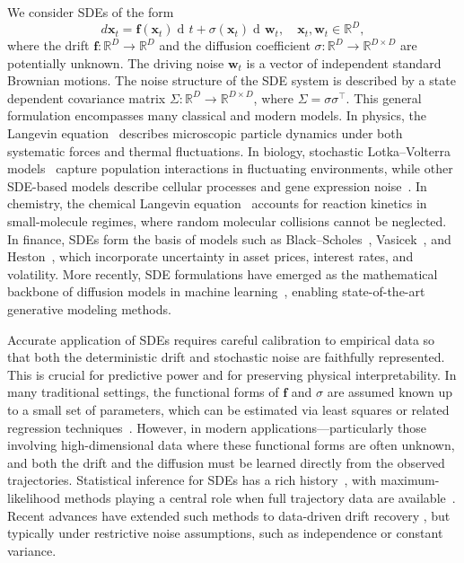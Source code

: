 \documentclass[11pt]{article} %
\def\rvw{{\mathbf{w}}}
\def\rvx{{\mathbf{x}}}
\def\vf{{\bm{f}}}
\newcommand{\R}{\mathbb{R}}
\DeclareMathOperator{\dif}{d \!}        %
\begin{document}
We consider SDEs of the form
\[
d\rvx_t = \vf(\rvx_t)\dif t + \sigma(\rvx_t) \dif \rvw_t, \quad \rvx_t, \rvw_t \in \R^D,
\]
where the drift $\vf: \R^D \rightarrow \R^D$ and the diffusion coefficient $\sigma: \R^D \rightarrow \R^{D \times D}$ are potentially unknown.  The driving noise $\rvw_t$ is a vector of independent standard Brownian motions. The noise structure of the SDE system is described by a state dependent covariance matrix $\Sigma: \R^D \rightarrow \R^{D \times D}$, where $\Sigma = \sigma \sigma^\intercal$.  This general formulation encompasses many classical and modern models. In physics, the Langevin equation~\citep{sachs2017langevin, doi:10.1142/8195, EGNS2008, Talay2002StochasticHS} describes microscopic particle dynamics under both systematic forces and thermal fluctuations. In biology, stochastic Lotka–Volterra models~\citep{takeuchi2006evolution} capture population interactions in fluctuating environments, while other SDE-based models describe cellular processes and gene expression noise~\citep{SZEKELY201414, DP2011}. In chemistry, the chemical Langevin equation~\citep{10.1063/1.4948407} accounts for reaction kinetics in small-molecule regimes, where random molecular collisions cannot be neglected. In finance, SDEs form the basis of models such as Black–Scholes~\citep{0b9b8115-a8b8-3422-8e1c-a62077de6621, hull2017options}, Vasicek~\citep{VASICEK1977177}, and Heston~\citep{10.1093/rfs/6.2.327}, which incorporate uncertainty in asset prices, interest rates, and volatility. More recently, SDE formulations have emerged as the mathematical backbone of diffusion models in machine learning~\citep{ho2020denoising, song2020score}, enabling state-of-the-art generative modeling methods.

Accurate application of SDEs requires careful calibration to empirical data so that both the deterministic drift and stochastic noise are faithfully represented. This is crucial for predictive power and for preserving physical interpretability. In many traditional settings, the functional forms of $\vf$ and $\sigma$ are assumed known up to a small set of parameters, which can be estimated via least squares or related regression techniques~\citep{MrazekPospisil2017, 935092}. However, in modern applications—particularly those involving high-dimensional data where these functional forms are often unknown, and both the drift and the diffusion must be learned directly from the observed trajectories. Statistical inference for SDEs has a rich history~\citep{KutoyantsBook2004}, with maximum-likelihood methods playing a central role when full trajectory data are available~\citep[Chapter $7$]{liptser2001statistics}. Recent advances have extended such methods to data-driven drift recovery \cite{guo2024learning}, but typically under restrictive noise assumptions, such as independence or constant variance.
\end{document}
